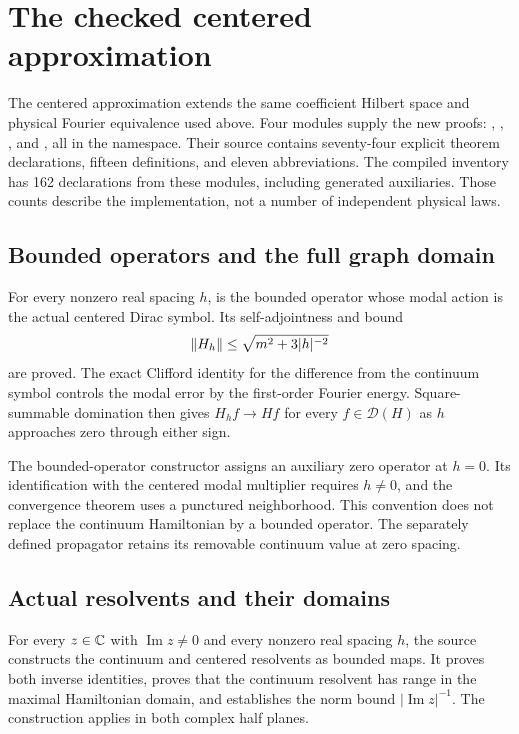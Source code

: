 \section{The checked centered approximation}

The centered approximation extends the same coefficient Hilbert space and physical Fourier equivalence used above. Four modules supply the new proofs: , , , and , all in the  namespace. Their source contains seventy-four explicit theorem declarations, fifteen definitions, and eleven abbreviations. The compiled inventory has 162 declarations from these modules, including generated auxiliaries. Those counts describe the implementation, not a number of independent physical laws.

\subsection{Bounded operators and the full graph domain}

For every nonzero real spacing $h$,  is the bounded operator whose modal action is the actual centered Dirac symbol. Its self-adjointness and bound
\[
 \left\lVert H_h\right\rVert\le \sqrt{m^2+3|h|^{-2}}
\]
are proved. The exact Clifford identity for the difference from the continuum symbol controls the modal error by the first-order Fourier energy. Square-summable domination then gives $H_hf\to Hf$ for every $f\in\mathcal D(H)$ as $h$ approaches zero through either sign.

The bounded-operator constructor assigns an auxiliary zero operator at $h=0$. Its identification with the centered modal multiplier requires $h\ne0$, and the convergence theorem uses a punctured neighborhood. This convention does not replace the continuum Hamiltonian by a bounded operator. The separately defined propagator retains its removable continuum value at zero spacing.

\subsection{Actual resolvents and their domains}

For every $z\in\mathbb C$ with $\operatorname{Im}z\ne0$ and every nonzero real spacing $h$, the source constructs the continuum and centered resolvents as bounded maps. It proves both inverse identities, proves that the continuum resolvent has range in the maximal Hamiltonian domain, and establishes the norm bound $|\operatorname{Im}z|^{-1}$. The construction applies in both complex half planes.

